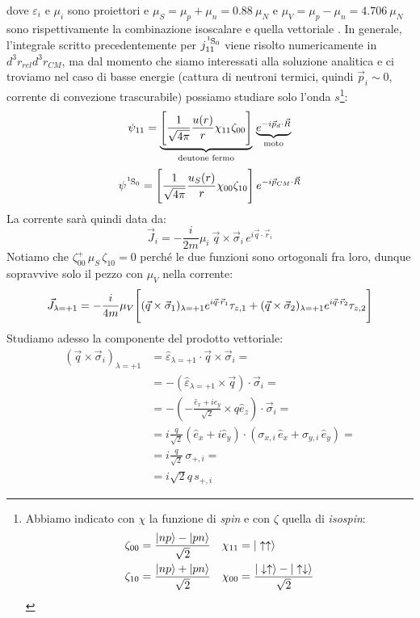 dove $\varepsilon_i$ e $\mu_i$ sono proiettori e $\mu_S = \mu_p + \mu_n = 0.88\: \mu_N $ e $\mu_V = \mu_p - \mu_n = 4.706 \: \mu_N$ sono rispettivamente la combinazione isoscalare e quella vettoriale . In generale, l'integrale scritto precedentemente per $j_{11}^{\ce{^1S_0}}$ viene risolto numericamente in $d^3r_{rel}d^3r_{CM}$, ma dal momento che siamo interessati alla soluzione analitica e ci troviamo nel caso di basse energie (cattura di neutroni termici, quindi $\vec{p}_i\sim 0$, corrente di convezione trascurabile) possiamo studiare solo l'onda $s$\footnote{Abbiamo indicato con $\chi$ la funzione di \textit{spin} e con $\zeta$ quella di \textit{isospin}:%
\begin{displaymath}
\begin{aligned}
\zeta_{00} &= \frac{|np\rangle-|pn\rangle}{\sqrt{2}} & \chi_{11} &= |\uparrow\uparrow\rangle \\
\zeta_{10} &= \frac{|np\rangle+|pn\rangle}{\sqrt{2}} & \chi_{00} &= \frac{|\downarrow\uparrow\rangle-|\uparrow\downarrow\rangle}{\sqrt{2}} 
\end{aligned}
\end{displaymath}%
}:
$$\psi_{11} = \underbrace{\Biggl [ \frac{1}{\sqrt{4\pi}}\frac{u(r)}{r}\chi_{11}\zeta_{00} \Biggr ]}_\text{deutone fermo}\, \underbrace{e^{-i\vec{p}_d\cdot\vec{R}}}_\text{moto}$$
$$\psi^{\ce{^1S_0}} = \PPq{\frac{1}{\sqrt{4\pi}}\frac{u_S(r)}{r}\chi_{00}\zeta_{10}}\, e^{-i\vec{p}_{CM}\cdot\vec{R}}$$
La corrente sarà quindi data da:
$$\vec{J}_i = -\frac{i}{2m} \mu_i\: \vec{q}\times \vec{\sigma}_i\, e^{i\vec{q}\cdot \vec{r}_i}$$
Notiamo che $\zeta_{00}^+\, \mu_S\, \zeta_{10} = 0$ perché le due funzioni sono ortogonali fra loro, dunque sopravvive solo il pezzo con $\mu_V$ nella corrente:
$$\vec{J}_{\lambda=+1} = -\frac{i}{4m} \mu_V \Biggl [ (\vec{q}\times\vec{\sigma}_1)_{\lambda=+1} e^{i\vec{q}\cdot\vec{r}_1}\tau_{z,1} + (\vec{q}\times\vec{\sigma}_2)_{\lambda=+1} e^{i\vec{q}\cdot\vec{r}_2}\tau_{z,2} \Biggr ] $$
Studiamo adesso la componente del prodotto vettoriale:
\begin{displaymath}
\begin{aligned}
(\vec{q}\times\vec{\sigma}_i)_{\lambda=+1} &= \widehat{\varepsilon}_{\lambda=+1} \cdot \vec{q}\times\vec{\sigma}_i =\\
&= -(\widehat{\varepsilon}_{\lambda=+1} \times \vec{q})\cdot\vec{\sigma}_i =\\
&=-(-\frac{\hat{e}_x + i\hat{e}_y}{\sqrt{2}} \times q\hat{e}_z)\cdot\vec{\sigma}_i =\\
&= i \frac{q}{\sqrt{2}} (\hat{e}_x + i\hat{e}_y)\cdot (\sigma_{x,i}\,\hat{e}_x + \sigma_{y,i}\,\hat{e}_y)=\\
&= i \frac{q}{\sqrt{2}}\, \sigma_{+,i} =\\
&= i \sqrt{2} q \, s_{+,i} 
\end{aligned}
\end{displaymath}
